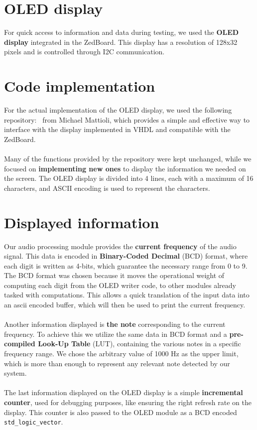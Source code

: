 \section{OLED display}

For quick access to information and data during testing, we used the \textbf{OLED
display} integrated in the ZedBoard. This display has a resolution of 128x32 pixels
and is controlled through I2C communication.

\section{Code implementation}

For the actual implementation of the OLED display, we used the following
repository:~\cite{OLED:repo} from Michael Mattioli, which provides a simple and
effective way to interface with the display implemented in VHDL and compatible with the ZedBoard.
\paragraph{}

Many of the functions provided by the repository were kept unchanged, while we focused
on \textbf{implementing new ones} to display the information we needed on the screen.
The OLED display is divided into 4 lines, each with a maximum of 16 characters,
and ASCII encoding is used to represent the characters.

\section{Displayed information}

Our audio processing module provides the \textbf{current frequency} of the audio signal. This data is
encoded in \textbf{Binary-Coded Decimal} (BCD) format, where each digit is written as 4-bits,
which guarantee the necessary range from 0 to 9.
The BCD format was chosen because it moves the operational weight of computing each digit
from the OLED writer code, to other modules already tasked with computations.
This allows a quick translation of the input data into an ascii encoded buffer, which will
then be used to print the current frequency.
\paragraph{}

Another information displayed is \textbf{the note} corresponding to the current frequency.
To achieve this we utilize the same data in BCD format and a \textbf{pre-compiled Look-Up Table} (LUT),
containing the various notes in a specific frequency range.
We chose the arbitrary value of 1000 Hz as the upper limit, which is more than enough to
represent any relevant note detected by our system.
\paragraph{}

The last information displayed on the OLED display is a simple \textbf{incremental counter},
used for debugging purposes, like ensuring the right refresh rate on the display.
This counter is also passed to the OLED module as a BCD encoded \texttt{std\_logic\_vector}.

